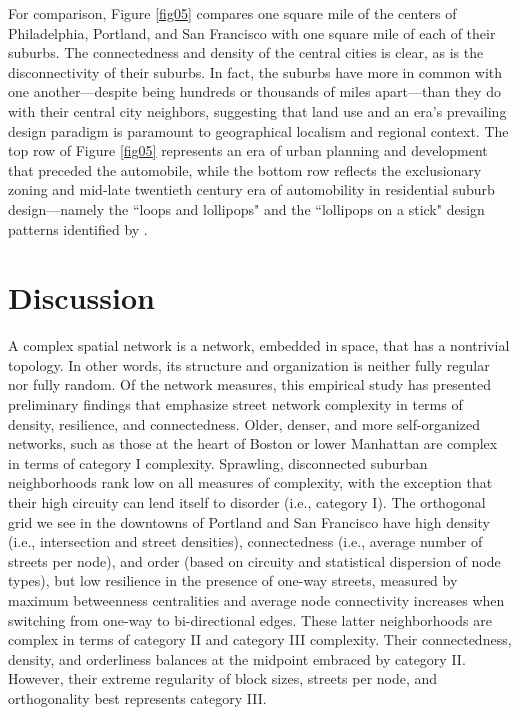 \documentclass{article}
\begin{document}
For comparison, Figure \ref{fig05} compares one square mile of the centers of Philadelphia, Portland, and San Francisco with one square mile of each of their suburbs. The connectedness and density of the central cities is clear, as is the disconnectivity of their suburbs. In fact, the suburbs have more in common with one another---despite being hundreds or thousands of miles apart---than they do with their central city neighbors, suggesting that land use and an era's prevailing design paradigm is paramount to geographical localism and regional context. The top row of Figure \ref{fig05} represents an era of urban planning and development that preceded the automobile, while the bottom row reflects the exclusionary zoning and mid-late twentieth century era of automobility in residential suburb design---namely the ``loops and lollipops" and the ``lollipops on a stick" design patterns identified by \citet{southworth_streets_1997}.

\section{Discussion}

A complex spatial network is a network, embedded in space, that has a nontrivial topology. In other words, its structure and organization is neither fully regular nor fully random. Of the network measures, this empirical study has presented preliminary findings that emphasize street network complexity in terms of density, resilience, and connectedness. Older, denser, and more self-organized networks, such as those at the heart of Boston or lower Manhattan are complex in terms of category I complexity. Sprawling, disconnected suburban neighborhoods rank low on all measures of complexity, with the exception that their high circuity can lend itself to disorder (i.e., category I). The orthogonal grid we see in the downtowns of Portland and San Francisco have high density (i.e., intersection and street densities), connectedness (i.e., average number of streets per node), and order (based on circuity and statistical dispersion of node types), but low resilience in the presence of one-way streets, measured by maximum betweenness centralities and average node connectivity increases when switching from one-way to bi-directional edges. These latter neighborhoods are complex in terms of category II and category III complexity. Their connectedness, density, and orderliness balances at the midpoint embraced by category II. However, their extreme regularity of block sizes, streets per node, and orthogonality best represents category III.
\end{document}
